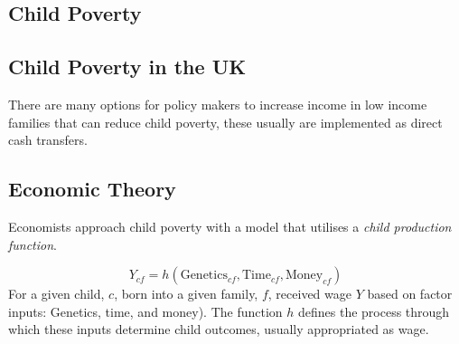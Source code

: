 \documentclass[../Main.tex]{subfiles}
\begin{document}
\begin{refsection}

\chapter{Child Poverty}

\chaptertoc
{}

\section{Child Poverty in the UK}

There are many options for policy makers to increase income in low income
families that can reduce child poverty, these usually are implemented as direct
cash transfers.



\section{Economic Theory}

Economists approach child poverty with a model that utilises a \textit{child
production function}.  

$$
Y_{cf} = h(\text{Genetics}_{cf}, \text{Time}_{cf}, \text{Money}_{cf})
$$
For a given child, $c$, born into a given family, $f$, received wage $Y$ based
on factor inputs: Genetics, time, and money). 
The function $h$ defines the process through which these inputs determine child
outcomes, usually appropriated as wage.


\end{refsection}
\end{document}
